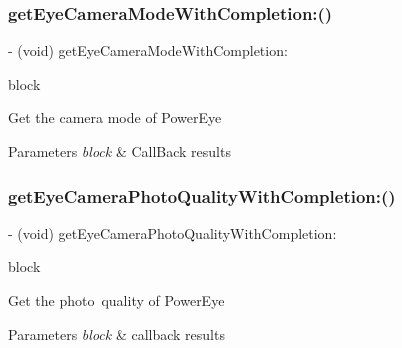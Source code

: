 \subsubsection{\texorpdfstring{get\+Eye\+Camera\+Mode\+With\+Completion\+:()}{getEyeCameraModeWithCompletion:()}}
{\footnotesize\ttfamily -\/ (void) get\+Eye\+Camera\+Mode\+With\+Completion\+: \begin{DoxyParamCaption}\item[{(void($^\wedge$)(P\+V\+Eye\+Camera\+Mode camera\+Mode, N\+S\+Error $\ast$\hyperlink{group___p_v_s_d_k___c_o_r_e___a_p_i___m_o_u_n_t_c_o_n_t_r_o_l_ga5a1de33b230662127568783314b4a54d}{\+\_\+\+Nullable} error))}]{block }\end{DoxyParamCaption}}

Get the camera mode of Power\+Eye


\begin{DoxyParams}{Parameters}
{\em block} & Call\+Back results \\
\hline
\end{DoxyParams}
\mbox{\label{interface_p_v_camera_a91474a4ded096681ac9b787cd87db98b}} 
\subsubsection{\texorpdfstring{get\+Eye\+Camera\+Photo\+Quality\+With\+Completion\+:()}{getEyeCameraPhotoQualityWithCompletion:()}}
{\footnotesize\ttfamily -\/ (void) get\+Eye\+Camera\+Photo\+Quality\+With\+Completion\+: \begin{DoxyParamCaption}\item[{(void($^\wedge$)(P\+V\+Eye\+Camera\+Photo\+Quality photo\+Quality, N\+S\+Error $\ast$\hyperlink{group___p_v_s_d_k___c_o_r_e___a_p_i___m_o_u_n_t_c_o_n_t_r_o_l_ga5a1de33b230662127568783314b4a54d}{\+\_\+\+Nullable} error))}]{block }\end{DoxyParamCaption}}

Get the photo quality of Power\+Eye


\begin{DoxyParams}{Parameters}
{\em block} & callback results \\
\hline
\end{DoxyParams}
\mbox{\label{interface_p_v_camera_a28e7682886ebf5f88cbf96df972b3cce}} 
